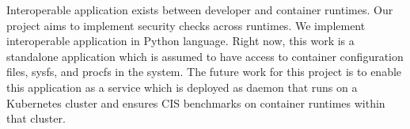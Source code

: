 Interoperable application exists between developer and container runtimes. Our project aims to implement security checks across runtimes. We implement interoperable application in Python language. Right now, this work is a standalone application which is assumed to have access to container configuration files, sysfs, and procfs in the system. The future work for this project is to enable this application as a service which is deployed as daemon that runs on a Kubernetes cluster and ensures CIS benchmarks on container runtimes within that cluster.